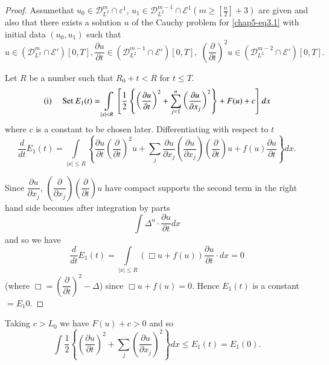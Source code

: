 \begin{proof}%
Assume\pageoriginale that $u_0 \in \mathscr{D}^m_{L^2} \cap
\varepsilon^1$, $u_1 \in \mathscr{D}^{m-1}_{L^2}\cap
\mathscr{E}^1 (m \geq \left[\frac{n}{2} \right] + 3)$ are
given and also 
that there exists a solution $u$ of the Cauchy problem for
\eqref{chap5-eq3.1} with initial data $(u_0, u_1)$ such that  
{\fontsize{10pt}{12pt}\selectfont
$$
u \in (\mathscr{D}^{m}_{L^2} \cap \mathscr{E}') [0, T],
\frac{\partial u}{\partial t} \in(\mathscr{D}^{m-1}_{L^2}
\cap \mathscr{E}') [0, T], \; \left(\frac{\partial}{\partial
  t}\right)^2 u \in (\mathscr{D}^{m-2}_{L^2} \cap 
\mathscr{E}')[0, T].  
$$}\relax

Let $R$ be a number such that $R_0 + t < R$ for $t \leq T$.  
\begin{equation*}
{\rm(i)}\quad \text{ Set } E_1 (t) = \int\limits_{|x|<R}
  \left[\dfrac{1}{2} \left\{\left(\frac{\partial u}{\partial t}\right)^2 +
    \sum\limits^n_{j=1} \left(\frac{\partial 
    u}{\partial x_j}\right)^2 \right\} + F(u) + c \right] dx 
 \end{equation*}
 where $c$ is a constant to be chosen later. Differentiating with
 respect to $t$  
$$
\frac{d}{dt} E_1 (t) = \int\limits_{|x|\leq R} \left\{ \frac{\partial 
  u}{\partial t} \left(\frac{\partial }{\partial t}\right)^2 u + \sum_{j}
   \frac{\partial u}{\partial x_j }\left(\frac{\partial
  u}{\partial x_j }\right)  \left(\frac{\partial}{\partial t}\right) u + f (u)
\frac{\partial u}{\partial t}\right\} dx.  
$$

Since $\dfrac{\partial u}{\partial x_j}$, $\left(\dfrac{\partial}{\partial
  x_j}\right) \left(\dfrac{\partial}{\partial t}\right)u $ have
compact supports the 
second term in the right hand side becomes after integration by parts  
$$
\int \Delta^u \cdot\frac{\partial u}{\partial t} dx 
$$
and so we have 
$$
\frac{d}{dt} E_1 (t) = \int\limits_{|x|\leq R} (\Box u + f (u))
\frac{\partial u}{\partial t} \cdot dx = 0 
$$
(where $\Box = \left(\dfrac{\partial }{\partial t}\right)^2 - \Delta$)
since $\Box u + f (u) = 0 $. Hence $E_1 (t)$ is a constant $= E_1 0$.  
\end{proof}

Taking $c>L_0$ we have $F(u)+ c>0$ and so 
\begin{equation*}
\int \frac{1}{2} \left\{ \left(\frac{\partial u}{\partial t}\right)^2
+ \sum_j \left(\frac{\partial u}{\partial x_j}\right)^2 \right\} dx
\leq E_1 (t) = E_1 (0). \tag{3.2}\label{chap5-eq3.2} 
\end{equation*}\pageoriginale

